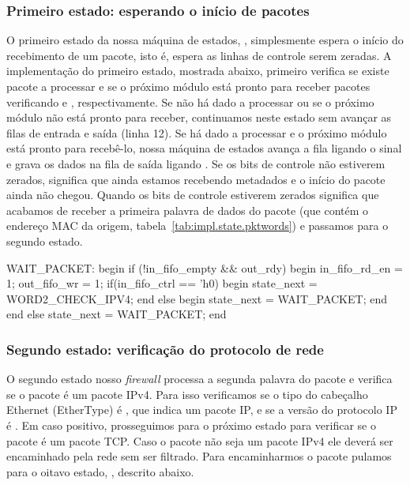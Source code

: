 \subsubsection*{Primeiro estado: esperando o início de pacotes}

O primeiro estado da nossa máquina de estados, ,
simplesmente espera o início do recebimento de um pacote, isto é,
espera as linhas de controle serem zeradas.  A implementação do
primeiro estado, mostrada abaixo, primeiro verifica se existe pacote
a processar e se o próximo módulo está pronto para receber pacotes
verificando  e , respectivamente.
Se não há dado a processar ou se o próximo módulo não está pronto
para receber, continuamos neste estado sem avançar as filas de
entrada e saída (linha 12).  Se há dado a processar e o próximo
módulo está pronto para recebê-lo, nossa máquina de estados avança a
fila ligando o sinal  e grava os dados na fila
de saída ligando .  Se os bits de controle
 não estiverem zerados, significa que ainda
estamos recebendo metadados e o início do pacote ainda não chegou.
Quando os bits de controle estiverem zerados significa que acabamos
de receber a primeira palavra de dados do pacote (que contém o
endereço MAC da origem, tabela~\ref{tab:impl.state.pktwords}) e
passamos para o segundo estado.

\begin{verilogcode}
  WAIT_PACKET: begin
     if (!in_fifo_empty && out_rdy) begin
        in_fifo_rd_en = 1;
        out_fifo_wr = 1;
        if(in_fifo_ctrl == 'h0) begin
           state_next = WORD2_CHECK_IPV4;
        end else begin
           state_next = WAIT_PACKET;
        end
     end
     else
        state_next = WAIT_PACKET;
  end
\end{verilogcode}


\subsubsection*{Segundo estado: verificação do protocolo de rede}

O segundo estado nosso \emph{firewall} processa a segunda palavra do
pacote e verifica se o pacote é um pacote IPv4.  Para isso
verificamos se o tipo do cabeçalho Ethernet (EtherType) é
, que indica um pacote IP, e se a versão do protocolo IP
é .\footnotemark{} Em caso positivo, prosseguimos para o
próximo estado para verificar se o pacote é um pacote TCP.  Caso o
pacote não seja um pacote IPv4 ele deverá ser encaminhado pela rede
sem ser filtrado.  Para encaminharmos o pacote pulamos para o oitavo
estado, , descrito abaixo.

